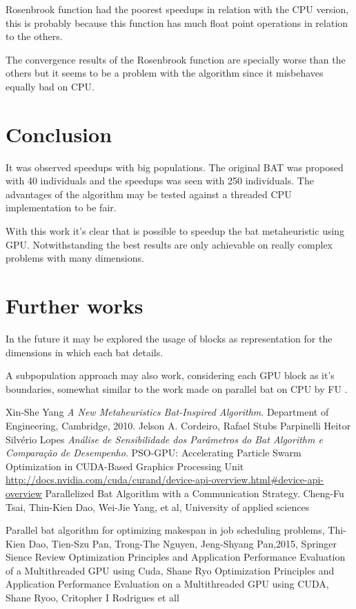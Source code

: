 \documentclass[conference]{IEEEtran}
\begin{document}
Rosenbrook function had the poorest speedups in relation with the CPU version, this is probably because this function has much float point operations in relation to the others.

The convergence results of the Rosenbrook function are specially worse than the others but it seems to be a problem with the algorithm since it misbehaves equally bad on CPU.

\section{Conclusion}

It was observed speedups with big populations. The original BAT was
proposed with 40 individuals and the speedups was seen with 250
individuals.
The advantages of the algorithm may be tested against a threaded CPU implementation to be fair.

With this work it's clear that is possible to speedup the bat metaheuristic using GPU. Notwithstanding the best results are only achievable on really complex problems with many dimensions.

\section{Further works}

In the future it may be explored the usage of blocks as representation for the
dimensions in which each bat details.

A subpopulation approach may also work, considering each GPU block as it's boundaries, somewhat similar to the work made on parallel bat on CPU by FU \cite{paralellCPU}.

\begin{thebibliography}{1}

    Xin-She Yang \emph{A New Metaheuristics Bat-Inspired Algorithm}. Department of Engineering, Cambridge, 2010.
    Jelson A. Cordeiro, Rafael Stubs Parpinelli Heitor Silvério Lopes \emph{Análise de Sensibilidade dos Parâmetros do Bat Algorithm e Comparação de Desempenho}.
    PSO-GPU: Accelerating Particle Swarm Optimization in CUDA-Based Graphics Processing Unit
    \url{http://docs.nvidia.com/cuda/curand/device-api-overview.html#device-api-overview}
    Parallelized Bat Algorithm with a Communication Strategy. Cheng-Fu Tsai, Thin-Kien Dao, Wei-Jie Yang, et al, University of applied sciences

    Parallel bat algorithm for optimizing makespan in job scheduling problems, Thi-Kien Dao, Tien-Szu Pan, Trong-The Nguyen, Jeng-Shyang Pan,2015, Springer Sience Review
    Optimization Principles and Application Performance Evaluation of a Multithreaded GPU using Cuda, Shane Ryo
    Optimization Principles and Application Performance Evaluation on a Multithreaded GPU using CUDA, Shane Ryoo, Critopher I Rodrigues et all

\end{thebibliography}
\end{document}
